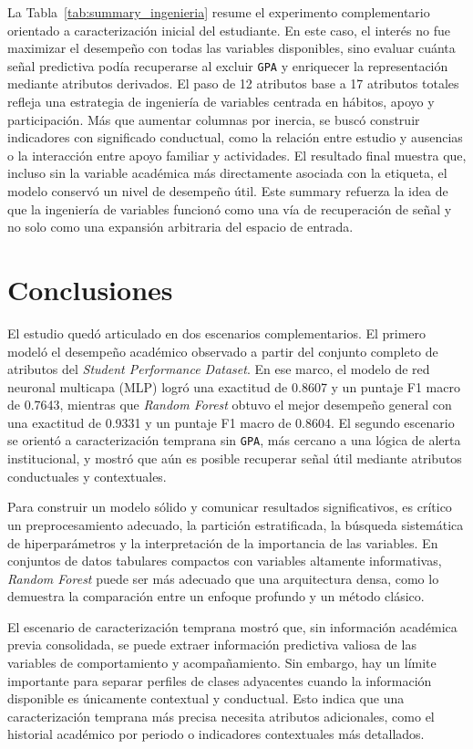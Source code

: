 \documentclass[conference]{IEEEtran}
\begin{document}
La Tabla~\ref{tab:summary_ingenieria} resume el experimento complementario orientado a caracterización inicial del estudiante. En este caso, el interés no fue maximizar el desempeño con todas las variables disponibles, sino evaluar cuánta señal predictiva podía recuperarse al excluir \texttt{GPA} y enriquecer la representación mediante atributos derivados. El paso de 12 atributos base a 17 atributos totales refleja una estrategia de ingeniería de variables centrada en hábitos, apoyo y participación. Más que aumentar columnas por inercia, se buscó construir indicadores con significado conductual, como la relación entre estudio y ausencias o la interacción entre apoyo familiar y actividades. El resultado final muestra que, incluso sin la variable académica más directamente asociada con la etiqueta, el modelo conservó un nivel de desempeño útil. Este summary refuerza la idea de que la ingeniería de variables funcionó como una vía de recuperación de señal y no solo como una expansión arbitraria del espacio de entrada.

\section{Conclusiones}\label{sec:conclusiones}

El estudio quedó articulado en dos escenarios complementarios. El primero modeló el desempeño académico observado a partir del conjunto completo de atributos del \textit{Student Performance Dataset}. En ese marco, el modelo de red neuronal multicapa (MLP) logró una exactitud de 0.8607 y un puntaje F1 macro de 0.7643, mientras que \textit{Random Forest} obtuvo el mejor desempeño general con una exactitud de 0.9331 y un puntaje F1 macro de 0.8604. El segundo escenario se orientó a caracterización temprana sin \texttt{GPA}, más cercano a una lógica de alerta institucional, y mostró que aún es posible recuperar señal útil mediante atributos conductuales y contextuales.

Para construir un modelo sólido y comunicar resultados significativos, es crítico un preprocesamiento adecuado, la partición estratificada, la búsqueda sistemática de hiperparámetros y la interpretación de la importancia de las variables. En conjuntos de datos tabulares compactos con variables altamente informativas, \textit{Random Forest} puede ser más adecuado que una arquitectura densa, como lo demuestra la comparación entre un enfoque profundo y un método clásico.

El escenario de caracterización temprana mostró que, sin información académica previa consolidada, se puede extraer información predictiva valiosa de las variables de comportamiento y acompañamiento. Sin embargo, hay un límite importante para separar perfiles de clases adyacentes cuando la información disponible es únicamente contextual y conductual. Esto indica que una caracterización temprana más precisa necesita atributos adicionales, como el historial académico por periodo o indicadores contextuales más detallados.
\end{document}
